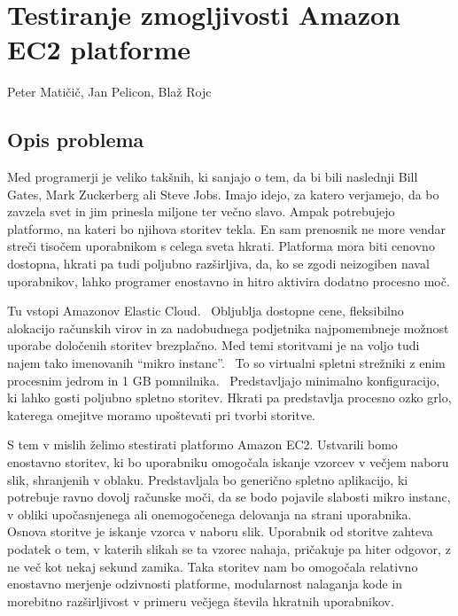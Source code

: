 \chapter[Testiranje zmogljivosti Amazon EC2 platforme (P. Matičič, J. Pelicon, B. Rojc)]{Testiranje zmogljivosti Amazon EC2 platforme}

\pagestyle{fancy}
\fancyhf{}
\fancyhead[LE,RO]{\thepage}
\fancyhead[RE,LO]{\leftmark}

\huge Peter Matičič, Jan Pelicon, Blaž Rojc
\normalsize
\bigskip

\section{Opis problema}

Med programerji je veliko takšnih, ki sanjajo o tem, da bi bili naslednji Bill Gates, Mark Zuckerberg ali Steve Jobs.
Imajo idejo, za katero verjamejo, da bo zavzela svet in jim prinesla miljone ter večno slavo.
Ampak potrebujejo platformo, na kateri bo njihova storitev tekla.
En sam prenosnik ne more vendar streči tisočem uporabnikom s celega sveta hkrati.
Platforma mora biti cenovno dostopna, hkrati pa tudi poljubno razširljiva, da, ko se zgodi neizogiben naval uporabnikov, lahko programer enostavno in hitro aktivira dodatno procesno moč.

Tu vstopi Amazonov Elastic Cloud.~\cite{1_aws_amazon_ec2} 
Obljublja dostopne cene, fleksibilno alokacijo računskih virov in za nadobudnega podjetnika najpomembneje možnost uporabe določenih storitev brezplačno.
Med temi storitvami je na voljo tudi najem tako imenovanih ``mikro instanc''.~\cite{1_aws_amazon_free} 
To so virtualni spletni strežniki z enim procesnim jedrom in 1 GB pomnilnika.~\cite{1_aws_amazon_instances}
Predstavljajo minimalno konfiguracijo, ki lahko gosti poljubno spletno storitev.
Hkrati pa predstavlja procesno ozko grlo, katerega omejitve moramo upoštevati pri tvorbi storitve.

S tem v mislih želimo stestirati platformo Amazon EC2.
Ustvarili bomo enostavno storitev, ki bo uporabniku omogočala iskanje vzorcev v večjem naboru slik, shranjenih v oblaku.
Predstavljala bo generično spletno aplikacijo, ki potrebuje ravno dovolj računske moči, da se bodo pojavile slabosti mikro instanc, v obliki upočasnjenega ali onemogočenega delovanja na strani uporabnika.
Osnova storitve je iskanje vzorca v naboru slik.
Uporabnik od storitve zahteva podatek o tem, v katerih slikah se ta vzorec nahaja, pričakuje pa hiter odgovor, z ne več kot nekaj sekund zamika.
Taka storitev nam bo omogočala relativno enostavno merjenje odzivnosti platforme, modularnost nalaganja kode in morebitno razširljivost v primeru večjega števila hkratnih uporabnikov.


